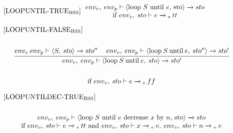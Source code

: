 \begin{equation}
\begin{minipage}{.2\linewidth}
$[\text{LOOPUNTIL-TRUE}_\text{BSS}]$
\end{minipage}
\begin{minipage}{.8\linewidth}
\centering
$env_v, \: env_p \vdash \langle $loop $S$ until $e$, sto$\rangle \xrightarrow{} sto$ \\
if $env_v, \: sto \vdash e \xrightarrow{}\textsubscript{e} \: tt$ 
\end{minipage}
\end{equation}

\begin{equation}
\begin{split}
\begin{minipage}{\linewidth}
$[\text{LOOPUNTIL-FALSE}_\text{BSS}]$
\end{minipage}
\\\\
\begin{minipage}{\linewidth}
\centering
$\cfrac{env_v \: env_p \vdash \langle S, \: sto \rangle \xrightarrow{} sto'' \quad\: env_v, \: env_p \vdash \langle \text{loop} \: S \: \text{until} \: e, \: sto'' \rangle \xrightarrow{} sto'}{env_v, \: env_p \vdash \langle \text{loop} \: S \: \text{until} \: e, \: sto \rangle \xrightarrow{} sto'}$ 
\end{minipage}
\\\\
\begin{minipage}{\linewidth}
\centering
if $env_v, \: sto \vdash e \xrightarrow{}\textsubscript{e} \: ff$
\end{minipage}
\end{split}
\end{equation}

\begin{equation}
\begin{split}
\begin{minipage}{\linewidth}
$[\text{LOOPUNTILDEC-TRUE}_\text{BSS}]$
\end{minipage}
\\\\
\begin{minipage}{\linewidth}
\centering
$env_v, \: env_p \vdash \langle $loop $S$ until $e$ decrease $x$ by $n$, sto$\rangle \xrightarrow{} sto$ \\
if $env_v, \: sto \vdash e \xrightarrow{}\textsubscript{e} \: tt$ and $env_v, \: sto \vdash x \xrightarrow{}\textsubscript{e} \: v, \: env_v, \: sto \vdash n \xrightarrow{}\textsubscript{e} \: v$ 
\end{minipage}
\end{split}
\end{equation}

